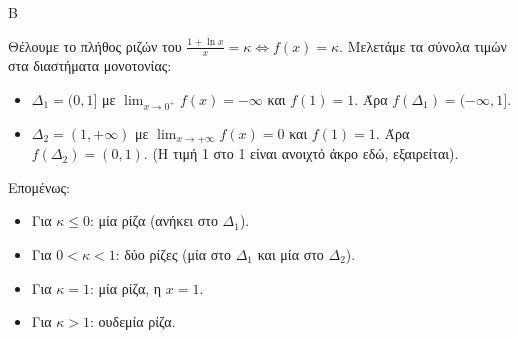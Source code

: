 \begin{thema}{Β}
\begin{erwthma}
\item Θέλουμε το πλήθος ριζών του $\frac{1+\ln x}{x} = \kappa \Leftrightarrow f(x) = \kappa$. 
Μελετάμε τα σύνολα τιμών στα διαστήματα μονοτονίας:
\begin{itemize}
\item $\Delta_1 = (0, 1]$ με $\lim_{x\to0^+} f(x) = -\infty$ και $f(1) = 1$. Άρα $f(\Delta_1) = (-\infty, 1]$.
\item $\Delta_2 = (1, +\infty)$ με $\lim_{x\to+\infty} f(x) = 0$ και $f(1) = 1$. Άρα $f(\Delta_2) = (0, 1)$. (Η τιμή 1 στο 1 είναι ανοιχτό άκρο εδώ, εξαιρείται).
\end{itemize}
Επομένως:
\begin{itemize}
\item Για $\kappa \le 0$: μία ρίζα (ανήκει στο $\Delta_1$).
\item Για $0 < \kappa < 1$: δύο ρίζες (μία στο $\Delta_1$ και μία στο $\Delta_2$).
\item Για $\kappa = 1$: μία ρίζα, η $x=1$.
\item Για $\kappa > 1$: ουδεμία ρίζα.
\end{itemize}
\end{erwthma}
\end{thema}
